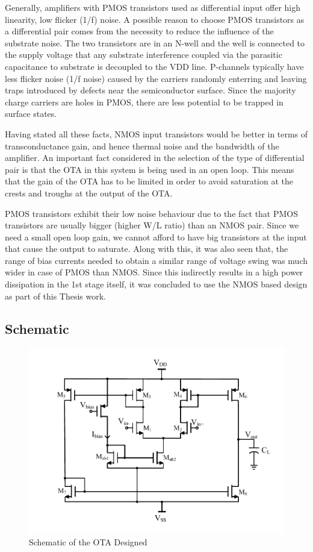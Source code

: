 Generally, amplifiers with PMOS transistors used as differential input offer high linearity, low flicker (1/f) noise. A possible reason to choose PMOS transistors as a differential pair comes from the necessity to reduce the influence of the substrate noise. The two transistors are in an N-well and the well is connected to the supply voltage that any substrate interference coupled via the parasitic capacitance to substrate is decoupled to the VDD line. P-channels typically have less flicker noise (1/f noise) caused by the carriers randomly enterring and leaving traps introduced by defects near the semiconductor surface. Since the majority charge carriers are holes in PMOS, there are less potential to be trapped in surface states.

Having stated all these facts, NMOS input transistors would be better in terms of transconductance gain, and hence thermal noise and the bandwidth of the amplifier. An important fact considered in the selection of the type of differential pair is that the OTA in this system is being used in an open loop. This means that the gain of the OTA has to be limited in order to avoid saturation at the crests and troughs at the output of the OTA.

PMOS transistors exhibit their low noise behaviour due to the fact that PMOS transistors are usually bigger (higher W/L ratio) than an NMOS pair. Since we need a small open loop gain, we cannot afford to have big transistors at the input that cause the output to saturate. Along with this, it was also seen that, the range of bias currents needed to obtain a similar range of voltage swing was much wider in case of PMOS than NMOS. Since this indirectly results in a high power dissipation in the 1st stage itself, it was concluded to use the NMOS based design as part of this Thesis work.
\vfill
\clearpage
\subsection{Schematic}

\begin{figure} [H]
\centering
\includegraphics[scale=1]{Figures/Schematics/OTA_NMOS_Vbias.pdf}
\caption{Schematic of the OTA Designed}
\label{fig:OTA_Schematic}
\end{figure}

